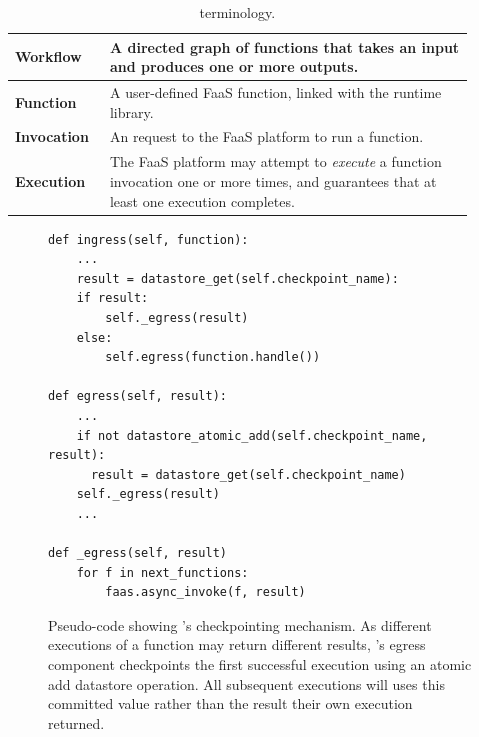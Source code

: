 
\begin{table}
  \centering
  \begin{tabular}{|m{0.18\linewidth}|m{0.73\linewidth}|}
    \hline
  \textbf{Workflow} & A directed graph of functions that takes an input and produces one or more outputs. \\
    \hline
  \textbf{Function} & A user-defined FaaS function, linked with the \name{} runtime library. \\
    \hline
  \textbf{Invocation} & An request to the FaaS platform to run a function. \\
    \hline
  \textbf{Execution} & The FaaS platform may attempt to \emph{execute} a function invocation one or more times, and guarantees that at least one execution completes. \\
    \hline
  \end{tabular}
  \caption{\name{} terminology.}
  \label{table:terms}
\end{table}


\begin{figure}
\begin{verbatim}
def ingress(self, function):
    ...
    result = datastore_get(self.checkpoint_name):
    if result:
        self._egress(result)
    else:
        self.egress(function.handle())

def egress(self, result):
    ...
    if not datastore_atomic_add(self.checkpoint_name, result):
      result = datastore_get(self.checkpoint_name)
    self._egress(result)
    ...

def _egress(self, result)
    for f in next_functions:
        faas.async_invoke(f, result)
\end{verbatim}
\caption{Pseudo-code showing \name{}'s checkpointing mechanism. As different
executions of a function may return different results, \name{}'s egress
component checkpoints the first successful execution using an atomic add
datastore operation. All subsequent executions will uses this committed value
rather than the result their own execution returned.}
\label{fig:design:checkpoint}
\end{figure}

